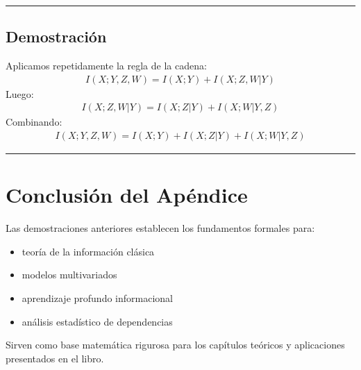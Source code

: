 \documentclass[letterpaper,10pt,english]{jupyterBook}
\begin{document}
\bigskip\hrule\bigskip



\subsection{Demostración}
\label{\detokenize{05_appendices/proofs:id11}}
\sphinxAtStartPar
Aplicamos repetidamente la regla de la cadena:
\begin{equation*}
\begin{split}
I(X;Y,Z,W)=I(X;Y)+I(X;Z,W|Y)
\end{split}
\end{equation*}
\sphinxAtStartPar
Luego:
\begin{equation*}
\begin{split}
I(X;Z,W|Y)=I(X;Z|Y)+I(X;W|Y,Z)
\end{split}
\end{equation*}
\sphinxAtStartPar
Combinando:
\begin{equation*}
\begin{split}
I(X;Y,Z,W)=I(X;Y)+I(X;Z|Y)+I(X;W|Y,Z)
\end{split}
\end{equation*}

\bigskip\hrule\bigskip



\section{Conclusión del Apéndice}
\label{\detokenize{05_appendices/proofs:conclusion-del-apendice}}
\sphinxAtStartPar
Las demostraciones anteriores establecen los fundamentos formales para:
\begin{itemize}
\item {} 
\sphinxAtStartPar
teoría de la información clásica

\item {} 
\sphinxAtStartPar
modelos multivariados

\item {} 
\sphinxAtStartPar
aprendizaje profundo informacional

\item {} 
\sphinxAtStartPar
análisis estadístico de dependencias

\end{itemize}

\sphinxAtStartPar
Sirven como base matemática rigurosa para los capítulos teóricos y aplicaciones presentados en el libro.

\sphinxstepscope
\end{document}
